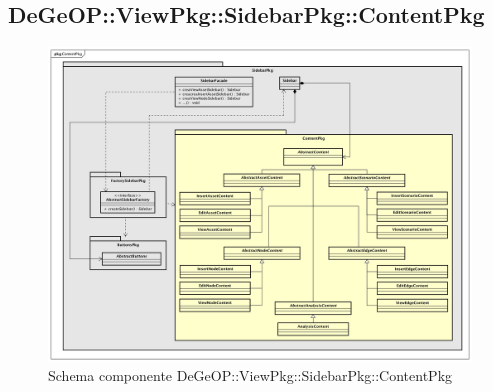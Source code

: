 \subsection{DeGeOP::ViewPkg::SidebarPkg::ContentPkg}
\label{pkg::ContentPkg}
\begin{figure}[H]
	\centering
	\includegraphics[width=\textwidth]{img/PkgDiagram/ContentPkg.png}
	\caption{Schema componente DeGeOP::ViewPkg::SidebarPkg::ContentPkg}
\end{figure}
